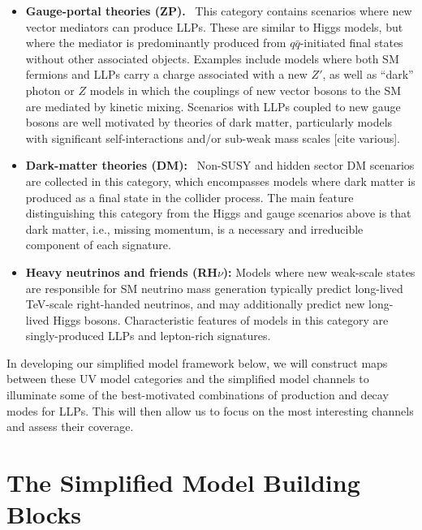 \begin{itemize}
\item {\bf Gauge-portal theories (ZP).}~ This category contains scenarios where new vector mediators can produce LLPs. These are similar to Higgs models, but where the mediator is predominantly produced from $q\bar{q}$-initiated final states without other associated objects. Examples include models where both SM fermions and LLPs carry a charge associated with a new $Z'$, as well as ``dark'' photon or $Z$ models in which the couplings of new vector bosons to the SM are mediated by kinetic mixing. Scenarios with LLPs coupled to new gauge bosons are well motivated by theories of dark matter, particularly models with significant self-interactions and/or sub-weak mass scales [cite various].

\item {\bf Dark-matter theories (DM):}~ Non-SUSY and hidden sector DM scenarios are collected in this category, which encompasses models where dark matter is produced as a final state in the collider process. The main feature distinguishing this category from the Higgs and gauge scenarios above is that dark matter, i.e., missing momentum, is a necessary and irreducible component of each signature.

\item {\bf Heavy neutrinos and friends (RH$\nu$):}  Models where  new weak-scale states are responsible for SM neutrino mass generation typically predict long-lived TeV-scale right-handed neutrinos, and may additionally predict new long-lived Higgs bosons.  Characteristic features of models in this category are singly-produced LLPs and lepton-rich signatures.

\end{itemize}

%
In developing our simplified model framework below, we will construct maps between these UV model categories and the simplified model channels to illuminate some of the best-motivated combinations of production and decay modes for LLPs. This will then allow us to focus on the most interesting channels and assess their coverage.


\section{The Simplified Model Building Blocks}\label{sec:building_blocks}


